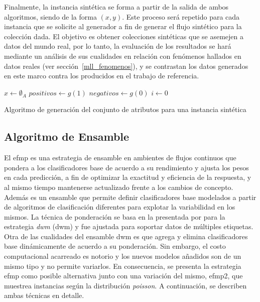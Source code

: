Finalmente, la instancia sintética se forma a partir de la salida de ambos
algoritmos, siendo de la forma $(x, y)$. Este proceso será repetido para cada
instancia que se solicite al generador a fin de generar el flujo sintético para
la colección dada. El objetivo es obtener colecciones sintéticas que se asemejen
a datos del mundo real, por lo tanto, la evaluación de los resultados se hará
mediante un análisis de sus cualidades en relación con fenómenos hallados en
datos reales (ver sección~\ref{mll_fenomenos}), y se contrastan los datos
generados en este marco contra los producidos en el trabajo de referencia.

\begin{center}
	\begin{algorithm}[H]
		\label{alg:generar_atributos}
		\SetAlgoLined
		\DontPrintSemicolon
		$x \gets \emptyset_{A}$\;
		$positivos \gets g(1)$ \;
		$negativos \gets g(0)$ \;
		$i \gets 0$ \;
		\caption{Algoritmo de generación del conjunto de atributos para una
			instancia sintética}
	\end{algorithm}
\end{center}

\subsection{Algoritmo de Ensamble}

El \acrfull{efmp} es una estrategia de ensamble en ambientes de flujos continuos
que pondera a los clasificadores base de acuerdo a su rendimiento y ajusta los
pesos en cada predicción, a fin de optimizar la exactitud y eficiencia de la
respuesta, y al mismo tiempo mantenerse actualizado frente a los cambios de
concepto. Además es un ensamble que permite definir clasificadores base
modelados a partir de algoritmos de clasificación diferentes para explotar la
variabilidad en los mismos. La técnica de ponderación se basa en la presentada
por \citeauthor{kolter_dynamic_2007} para la estrategia \textit{\acrlong{dwm}}
(\acrshort{dwm}) \cite{kolter_dynamic_2007} y fue ajustada para soportar datos
de múltiples etiquetas. Otra de las cualidades del ensamble \acrshort{dwm} es
que agrega y elimina clasificadores base dinámicamente de acuerdo a su
ponderación. Sin embargo, el costo computacional acarreado es notorio y los
nuevos modelos añadidos son de un mismo tipo y no permite variarlos.  En
consecuencia, se presenta la estrategia \acrshort{efmp} como posible alternativa
junto con una variación del mismo, \acrshort{efmp2}, que muestrea instancias
según la distribución \textit{poisson}. A continuación, se describen ambas
técnicas en detalle.

